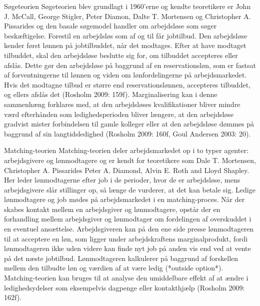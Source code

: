 Søgeteorien
Søgeteorien blev grundlagt i 1960'erne og kendte teoretikere er John J. McCall, George Stigler, Peter Diamon, Dalte T. Mortensen og Christopher A. Pissarides og den basale søgemodel handler om arbejdsløse som søger beskæftigelse. Forestil en arbejdsløs som af og til får jobtilbud. Den arbejdsløse kender først lønnen på jobtilbuddet, når det modtages. Efter at have modtaget tilbuddet, skal den arbejdsløse beslutte sig for, om tilbuddet accepteres eller afslås. Dette gør den arbejdsløse på baggrund af en reservationsløn, som er fastsat af forventningerne til lønnen og viden om lønfordelingerne på arbejdsmarkedet. Hvis det modtagne tilbud er større end reservationslønnen, accepteres tilbuddet, og ellers afslås det (Rosholm 2009: 159f). Marginalisering kan i denne sammenhæng forklares med, at den arbejdsløses kvalifikationer bliver mindre værd efterhånden som ledighedsperioden bliver længere, at den arbejdsløse gradvist mister forbindelsen til gamle kolleger eller at den arbejdsløse dømmes på baggrund af sin langtidsledighed (Rosholm 2009: 160f, Goul Andersen 2003: 20).

Matching-teorien
Matching-teorien deler arbejdsmarkedet op i to typer agenter: arbejdsgivere og lønmodtagere og er kendt for teoretikere som Dale T. Mortensen, Christopher A. Pissarides Peter A. Diamond, Alvin E. Roth and Lloyd Shapley. Her leder lønmodtagerne efter job i de perioder, hvor de er arbejdsløse, mens arbejdsgivere slår stillinger op, så længe de vurderer, at det kan betale sig. Ledige lønmodtagere og job mødes på arbejdsmarkedet i en matching-proces. Når der skabes kontakt mellem en arbejdsgiver og lønmodtagere, opstår der en forhandling mellem arbejdsgiver og lønmodtager om fordelingen af overskuddet i en eventuel ansættelse. Arbejdsgiveren kan på den ene side presse lønmodtageren til at acceptere en løn, som ligger under arbejdskraftens marginalprodukt, fordi lønmodtageren ikke uden videre kan finde nyt job på anden vis end ved at vente på det næste jobtilbud. Lønmodtageren kalkulerer på baggrund af forskellen mellem den tilbudte løn og værdien af at være ledig (*outside option*). Matching-teorien kan bruges til at analyse den umiddelbare effekt af at ændre i ledighedsydelser som eksempelvis dagpenge eller kontakthjælp (Rosholm 2009: 162f).

